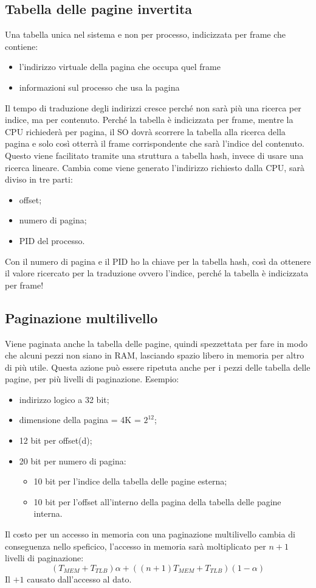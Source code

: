 \documentclass[a4paper, 12pt]{book}
\begin{document}
\subsection{Tabella delle pagine invertita}
Una tabella unica nel sistema e non per processo, indicizzata per frame che contiene:
\begin{itemize}
    \item l'indirizzo virtuale della pagina che occupa quel frame
    \item informazioni sul processo che usa la pagina
\end{itemize}
Il tempo di traduzione degli indirizzi cresce perché non sarà più una ricerca per indice, ma per contenuto. Perché 
la tabella è indicizzata per frame, mentre la CPU richiederà per pagina, il SO dovrà scorrere la tabella alla ricerca della 
pagina e solo così otterrà il frame corrispondente che sarà l'indice del contenuto. Questo viene facilitato tramite una struttura 
a tabella hash, invece di usare una ricerca lineare. Cambia come viene generato l'indirizzo richiesto dalla CPU, sarà diviso in tre parti:
\begin{itemize}
    \item offset;
    \item numero di pagina;
    \item PID del processo.
\end{itemize}

Con il numero di pagina e il PID ho la chiave per la tabella hash, così da ottenere il valore ricercato per la traduzione ovvero
l'indice, perché la tabella è indicizzata per frame!

\subsection{Paginazione multilivello}
Viene paginata anche la tabella delle pagine, quindi spezzettata per fare in modo che alcuni pezzi non siano in RAM, lasciando 
spazio libero in memoria per altro di più utile. Questa azione può essere ripetuta anche per i pezzi delle tabella delle pagine, 
per più livelli di paginazione.  Esempio:
\begin{itemize}
    \item indirizzo logico a 32 bit;
    \item dimensione della pagina = 4K = $2^{12}$;
    \item 12 bit per offset(d);
    \item 20 bit per numero di pagina:
    \begin{itemize}
        \item 10 bit per l'indice della tabella delle pagine esterna;
        \item 10 bit per l'offset all'interno della pagina della tabella delle pagine interna.
    \end{itemize}
\end{itemize}
Il costo per un accesso in memoria con una paginazione multilivello cambia di conseguenza nello speficico,
l'accesso in memoria sarà moltiplicato per $n + 1$ livelli di paginazione:
\[
    (T_{MEM} + T_{TLB})\alpha + ((n + 1)T_{MEM} + T_{TLB})(1 - \alpha)
\]
Il $+1$ causato dall'accesso al dato.
\end{document}
